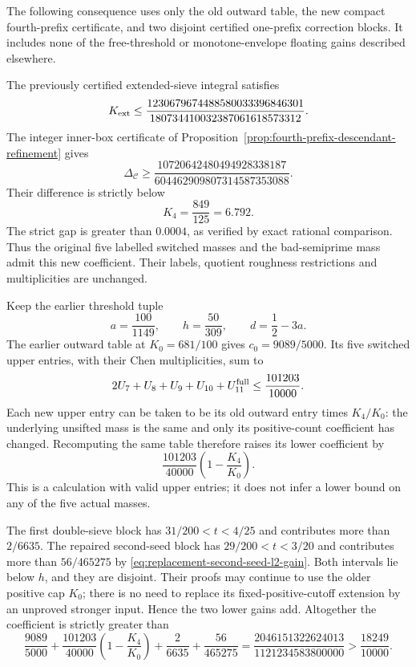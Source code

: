 \documentclass[11pt]{article}
\begin{document}
The following consequence uses only the old outward table, the new
compact fourth-prefix certificate, and two disjoint certified
one-prefix correction blocks. It includes none of the free-threshold
or monotone-envelope floating gains described elsewhere.

The previously certified extended-sieve integral satisfies
\[
 K_{\rm ext}\le
 \frac{1230679674488580033396846301}
      {180734410032387061618573312}.
\]
The integer inner-box certificate of
Proposition~\ref{prop:fourth-prefix-descendant-refinement} gives
\[
 \Delta_{\mathcal C}\ge
 \frac{10720642480494928338187}{604462909807314587353088}.
\]
Their difference is strictly below
\begin{equation}\label{eq:fourth-prefix-rounded-K}
 K_4=\frac{849}{125}=6.792.
\end{equation}
The strict gap is greater than $0.0004$, as verified by exact rational
comparison. Thus the original five labelled switched masses and the
bad-semiprime mass admit this new coefficient. Their labels, quotient
roughness restrictions and multiplicities are unchanged.

Keep the earlier threshold tuple
\[
 a=\frac{100}{1149},\qquad h=\frac{50}{309},\qquad
 d=\frac12-3a.
\]
The earlier outward table at $K_0=681/100$ gives $c_0=9089/5000$.
Its five switched upper entries, with their Chen multiplicities, sum to
\[
 2U_7+U_8+U_9+U_{10}+U_{11}^{\rm full}
 \le \frac{101203}{10000}.
\]
Each new upper entry can be taken to be its old outward entry times
$K_4/K_0$: the underlying unsifted mass is the same and only its
positive-count coefficient has changed. Recomputing the same table
therefore raises its lower coefficient by
\[
 \frac{101203}{40000}\left(1-\frac{K_4}{K_0}\right).
\]
This is a calculation with valid upper entries; it does not infer a
lower bound on any of the five actual masses.

The first double-sieve block has
$31/200<t<4/25$ and contributes more than $2/6635$.
The repaired second-seed block has $29/200<t<3/20$ and contributes
more than $56/465275$ by
\eqref{eq:replacement-second-seed-l2-gain}.
Both intervals lie below $h$, and they are disjoint.
Their proofs may continue to use the older positive cap $K_0$;
there is no need to replace its fixed-positive-cutoff extension by
an unproved stronger input. Hence the two lower gains add.
Altogether the coefficient is strictly greater than
\begin{equation}\label{eq:fourth-prefix-second-seed-c}
 \frac{9089}{5000}
 +\frac{101203}{40000}\left(1-\frac{K_4}{K_0}\right)
 +\frac2{6635}+\frac{56}{465275}
 =\frac{2046151322624013}{1121234583800000}
 >\frac{18249}{10000}.
\end{equation}
\end{document}
